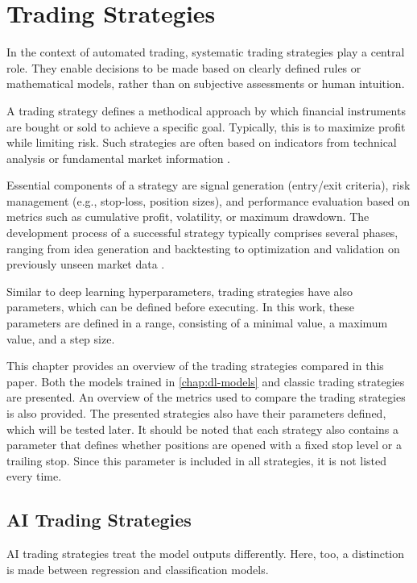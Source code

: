 \section{Trading Strategies}
\label{chap:trading-strategies}

In the context of automated trading, systematic trading strategies play a central role.
They enable decisions to be made based on clearly defined rules or mathematical models, rather than on subjective assessments or human intuition.

A trading strategy defines a methodical approach by which financial instruments are bought or sold to achieve a specific goal.
Typically, this is to maximize profit while limiting risk.
Such strategies are often based on indicators from technical analysis or fundamental market information \cite{investopia-trading-strategy}.

Essential components of a strategy are signal generation (entry/exit criteria), risk management (e.g., stop-loss, position sizes), and performance evaluation based on metrics such as cumulative profit, volatility, or maximum drawdown.
The development process of a successful strategy typically comprises several phases, ranging from idea generation and backtesting to optimization and validation on previously unseen market data \cite{investopia-trading-strategy-components}.

Similar to deep learning hyperparameters, trading strategies have also parameters, which can be defined before executing.
In this work, these parameters are defined in a range, consisting of a minimal value, a maximum value, and a step size.

This chapter provides an overview of the trading strategies compared in this paper.
Both the models trained in \autoref{chap:dl-models} and classic trading strategies are presented.
An overview of the metrics used to compare the trading strategies is also provided.
The presented strategies also have their parameters defined, which will be tested later.
It should be noted that each strategy also contains a parameter that defines whether positions are opened with a fixed stop level or a trailing stop.
Since this parameter is included in all strategies, it is not listed every time.

\subsection{AI Trading Strategies}
\label{chap:ai-strategies}

AI trading strategies treat the model outputs differently.
Here, too, a distinction is made between regression and classification models.

